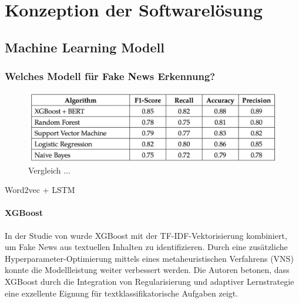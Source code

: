 \chapter{Konzeption der Softwarelösung}
\label{chap:konzeption_der_softwareloesung}

\section{Machine Learning Modell} %

\subsection{Welches Modell für Fake News Erkennung?}
\cite{sharma2025}

\begin{figure}[htbp]
    \begin{center}
        \includegraphics[scale=0.5]{static/xgboost_bert.png}
        \caption{\label{fig:xgboost_bert} Vergleich ... \cite{sharma2025}}
    \end{center}
\end{figure}

Word2vec + LSTM \cite{matheven2022}

\subsubsection{XGBoost}



In der Studie von \cite{petrovic2024} wurde XGBoost mit der TF-IDF-Vektorisierung kombiniert, 
um Fake News aus textuellen Inhalten zu identifizieren. Durch eine zusätzliche Hyperparameter-Optimierung mittels eines 
metaheuristischen Verfahrens (VNS) konnte die Modellleistung weiter verbessert werden. Die Autoren betonen, 
dass XGBoost durch die Integration von Regularisierung und adaptiver Lernstrategie eine exzellente Eignung für textklassifikatorische 
Aufgaben zeigt.

